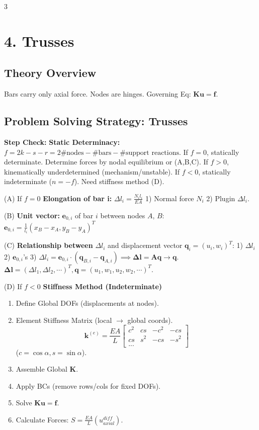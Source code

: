 \documentclass[8pt]{extarticle}
\newcommand{\step}[1]{\textbf{\scriptsize Step #1:}}
\begin{document}
\begin{multicols*}{3}
\section{4. Trusses}

\subsection{Theory Overview}
Bars carry only axial force. Nodes are hinges.
Governing Eq: $\mathbf{K}\mathbf{u} = \mathbf{f}$.

\subsection{Problem Solving Strategy: Trusses}

\step{Check} \textbf{Static Determinacy:} 
$f = 2k-s-r = 2\text{\#nodes}-\text{\#bars}-\text{\#support reactions}$. 
If $f=0$, statically determinate. Determine forces by nodal equilibrium or (A,B,C). 
If $f>0$, kinematically underdetermined (mechanism/unstable). 
If $f<0$, statically indeterminate ($n=-f$). Need stiffness method (D).

(A) If $f=0$ \textbf{Elongation of bar i:} $\Delta l_i = \frac{N_i l_i}{EA}$ 1) Normal force $N_i$ 2) Plugin $\Delta l_i$. 

(B) \textbf{Unit vector: } $\bm{e}_{0,i}$ of bar $i$ between nodes $A$, $B$: $\bm{e}_{0,i} = \frac{1}{l_i}(x_B-x_A, y_B-y_A)^T$

(C) \textbf{Relationship between } $\Delta l_i$ and displacement vector $\bm{q}_i=(u_i, w_i)^T$: 1) $\Delta l_i$ 2) $\bm{e}_{0,i}$'s 3) $\Delta l_i = \bm{e}_{0,i} \cdot (\bm{q}_{B,i} - \bm{q}_{A,i}) \implies \bm{\Delta l} = \bm{A}\bm{q} \rightarrow \bm{q}$.
$\bm{\Delta l}=(\Delta l_1, \Delta l_2, \cdots)^T, \bm{q} = (u_1, w_1, u_2, w_2, \cdots)^T$.

(D) If $f<0$ \textbf{Stiffness Method (Indeterminate)}
\begin{enumerate}
    \item Define Global DOFs (displacements at nodes).
    \item Element Stiffness Matrix (local $\to$ global coords).
    \[ \mathbf{k}^{(e)} = \frac{EA}{L} \begin{bmatrix} c^2 & cs & -c^2 & -cs \\ cs & s^2 & -cs & -s^2 \\ ... \end{bmatrix} \]
    ($c=\cos\alpha, s=\sin\alpha$).
    \item Assemble Global $\mathbf{K}$.
    \item Apply BCs (remove rows/cols for fixed DOFs).
    \item Solve $\mathbf{K}\mathbf{u} = \mathbf{f}$.
    \item Calculate Forces: $S = \frac{EA}{L} (u_{axial}^{diff})$.
\end{enumerate}


\end{multicols*}
\end{document}
